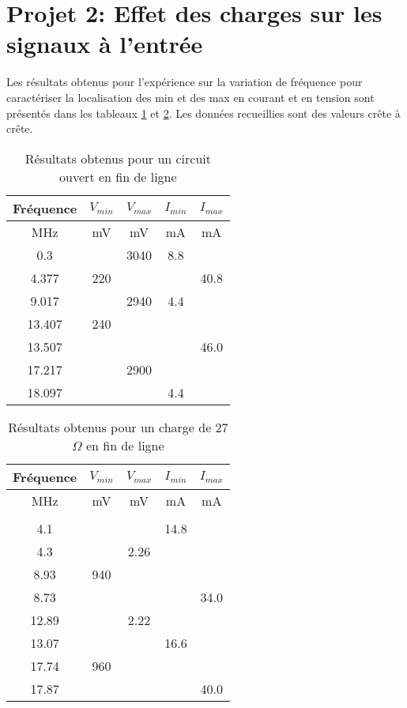 \section{Projet 2: Effet des charges sur les signaux à l'entrée}
Les résultats obtenus pour l'expérience sur la variation de fréquence pour caractériser la localisation des min et des max en courant et en tension sont présentés dans les tableaux \ref{tab:1} et \ref{tab:2}. Les données recueillies sont des valeurs crête à crête. 
\begin{table}[htbp]
  \centering
    \begin{tabular}{|c|c|c|c|c|}\hline
    Fréquence & $V_{min}$ & $V_{max}$ & $I_{min}$ & $I_{max}$ \\\hline
    MHz   & mV    & mV    & mA    & mA \\\hline
    0.3   &       & 3040  & 8.8    &  \\
    4.377 & 220   &       &       & 40.8 \\
    9.017 &       & 2940  & 4.4    &  \\
    13.407 & 240   &       &       &  \\
    13.507 &       &       &       & 46.0 \\
    17.217 &       & 2900  &       &  \\
    18.097 &       &       & 4.4    &  \\\hline
    \end{tabular}%
      \caption{Résultats obtenus pour un circuit ouvert en fin de ligne}
  \label{tab:1}%
\end{table}%

\begin{table}[htbp]
  \centering
    \begin{tabular}{|c|c|c|c|c|}\hline
    Fréquence & $V_{min}$ & $V_{max}$ & $I_{min}$ & $I_{max}$ \\\hline
    MHz   & mV    & mV    & mA    & mA \\\hline
          &       &       &       &  \\
    4.1   &       &       & 14.8   &  \\
    4.3   &       & 2.26  &       &  \\
    8.93  & 940   &       &       &  \\
    8.73  &       &       &       & 34.0 \\
    12.89 &       & 2.22  &       &  \\
    13.07 &       &       & 16.6   &  \\
    17.74 & 960   &       &       &  \\
    17.87 &       &       &       & 40.0 \\\hline
    \end{tabular}%
  \caption{Résultats obtenus pour un charge de 27$\Omega$ en fin de ligne}
  \label{tab:2}%
\end{table}%

